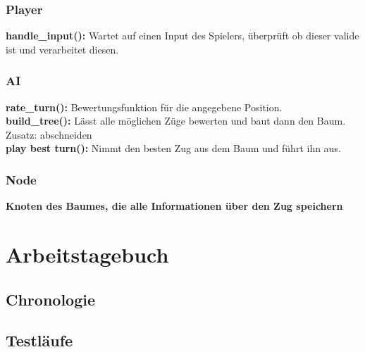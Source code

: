 \documentclass{article}
\begin{document}
\subsubsection{Player}

\textbf{handle\_input():} Wartet auf einen Input des Spielers, überprüft ob dieser valide
ist und verarbeitet diesen. \\

\subsubsection{AI}
\textbf{rate\_turn():} Bewertungsfunktion für die angegebene Position. \\
\textbf{build\_tree():} Lässt alle möglichen Züge bewerten und baut dann den Baum. \\
Zusatz: abschneiden \\
\textbf{play best turn():} Nimmt den besten Zug aus dem Baum und führt ihn aus. \\

\subsubsection{Node}
\textbf{Knoten des Baumes, die alle Informationen über den Zug speichern}


\newpage
\section{Arbeitstagebuch}\label{section-diary}

\subsection{Chronologie}
\subsection{Testläufe}


\end{document}

